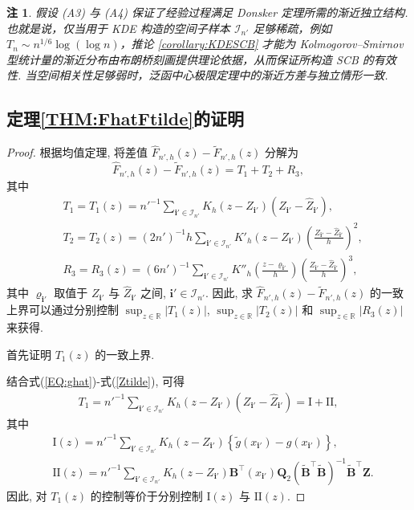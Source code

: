 \documentclass[a4paper,openay,14pt]{ctexbook}
\numberwithin{equation}{section}
\numberwithin{lem}{section}
\newtheorem{rema}[theorem]{注}%
\begin{document}
\begin{rema}
假设 (A3) 与 (A4) 保证了经验过程满足 Donsker 定理所需的渐近独立结构. 也就是说，仅当用于 KDE 构造的空间子样本 $\mathcal{I}_{n'}$ 足够稀疏，例如 $T_n \sim n^{1/6}\log(\log n)$，推论 \ref{corollary:KDESCB} 才能为 Kolmogorov–Smirnov 型统计量的渐近分布由布朗桥刻画提供理论依据，从而保证所构造 SCB 的有效性. 当空间相关性足够弱时，泛函中心极限定理中的渐近方差与独立情形一致.
\end{rema}

\subsection{定理\ref{THM:FhatFtilde}的证明}
\begin{proof}
根据均值定理, 将差值 $\hat{F}_{n',h}(z)-\tilde{F}_{n',h}(z)$ 分解为
\begin{equation}\label{EQ:Fnhhat-Fnhtilde}
    \hat{F}_{n',h}(z)-\tilde{F}_{n',h}(z)=T_1+T_2+R_3,
\end{equation}
其中
\begin{align*}
    &T_1=T_1(z)=n'^{-1}\sum_{\mathbf{i}'\in\mathcal{I}_{n'}}K_h\left(z-Z_{\mathbf{i}'}\right)\left(Z_{\mathbf{i}'}-\hat{Z}_{\mathbf{i}'}\right),\\
    &T_2=T_2(z)=(2n')^{-1}h\sum_{\mathbf{i}'\in\mathcal{I}_{n'}}K'_h\left(z-Z_{\mathbf{i}'}\right)\left(\frac{Z_{\mathbf{i}'}-\hat{Z}_{\mathbf{i}'}}{h}\right)^2,\\
    &R_3=R_3(z)=(6n')^{-1}\sum_{\mathbf{i}'\in\mathcal{I}_{n'}}K''_h\left(\frac{z-\varrho_{\mathbf{i}'}}{h}\right)\left(\frac{Z_{\mathbf{i}'}-\hat{Z}_{\mathbf{i}'}}{h}\right)^3,
\end{align*}
其中 $\varrho_{\mathbf{i}'}$ 取值于 $Z_{\mathbf{i}'}$ 与 $\hat{Z}_{\mathbf{i}'}$ 之间, $\mathbf{i}'\in\mathcal{I}_{n'}$. 因此, 求 $\hat{F}_{n',h}(z)-\tilde{F}_{n',h}(z)$ 的一致上界可以通过分别控制 $\sup_{z\in\mathbb{R}}|T_1(z)|$, $\sup_{z\in\mathbb{R}}|T_2(z)|$ 和 $\sup_{z\in\mathbb{R}}|R_3(z)|$ 来获得.

首先证明 $T_1(z)$ 的一致上界.

结合式(\ref{EQ:ghat})-式(\ref{Ztilde}), 可得
\begin{align}\label{EQ:T1}
    T_1
    =n'^{-1}\sum_{\mathbf{i}'\in\mathcal{I}_{n'}}
      K_h(z-Z_{\mathbf{i}'})\left(Z_{\mathbf{i}'}-\hat{Z}_{\mathbf{i}'}\right)
    =\mathrm{I}+\mathrm{II},
\end{align}
其中
\begin{align*}
    &\mathrm{I}(z)
    =n'^{-1}\sum_{\mathbf{i}'\in\mathcal{I}_{n'}}
      K_h(z-Z_{\mathbf{i}'})
      \left\{\tilde{g}(x_{\mathbf{i}'})-g(x_{\mathbf{i}'})\right\},\\
    &\mathrm{II}(z)
    =n'^{-1}\sum_{\mathbf{i}'\in\mathcal{I}_{n'}}
      K_h(z-Z_{\mathbf{i}'})
      \mathbf{B}^{\top}(x_{\mathbf{i}'})\mathbf{Q}_2
      \left(\tilde{\mathbf{B}}^{\top}\tilde{\mathbf{B}}\right)^{-1}
      \tilde{\mathbf{B}}^{\top}\mathbf{Z}.
\end{align*}
因此, 对 $T_1(z)$ 的控制等价于分别控制 $\mathrm{I}(z)$ 与 $\mathrm{II}(z)$.


\end{proof}
\end{document}
